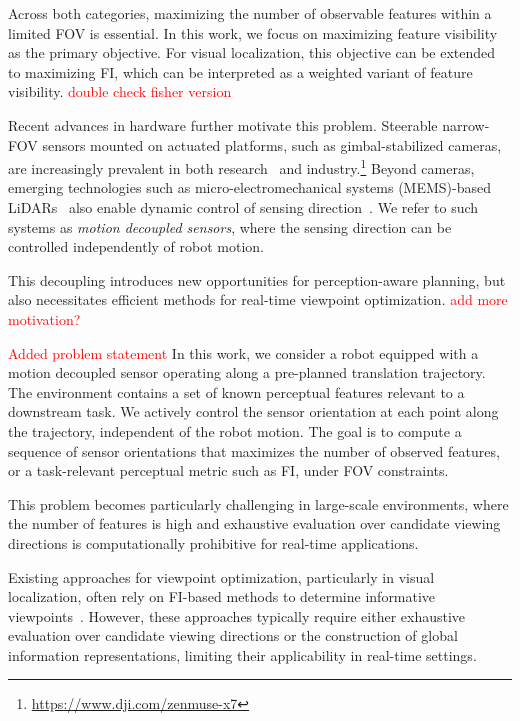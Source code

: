 \documentclass[letterpaper, 10 pt, conference]{ieeeconf}  %
\begin{document}
Across both categories, maximizing the number of observable features within a limited FOV is essential. In this work, we focus on maximizing feature visibility as the primary objective. For visual localization, this objective can be extended to maximizing FI, which can be interpreted as a weighted variant of feature visibility. \textcolor{red}{double check fisher version}

Recent advances in hardware further motivate this problem. Steerable narrow-FOV sensors mounted on actuated platforms, such as gimbal-stabilized cameras, are increasingly prevalent in both research~\cite{liu2020real, jakobsen2005control, zou2006pan} and industry.\footnote{\url{https://www.dji.com/zenmuse-x7}} Beyond cameras, emerging technologies such as micro-electromechanical systems (MEMS)-based LiDARs~\cite{wang2017ultra,wang2019large,wang2020low} also enable dynamic control of sensing direction~\cite{https://doi.org/10.48550/arxiv.2302.14334}. We refer to such systems as \emph{motion decoupled sensors}, where the sensing direction can be controlled independently of robot motion.

This decoupling introduces new opportunities for perception-aware planning, but also necessitates efficient methods for real-time viewpoint optimization. \textcolor{red}{add more motivation?}



\textcolor{red}{Added problem statement} In this work, we consider a robot equipped with a motion decoupled sensor operating along a pre-planned translation trajectory. The environment contains a set of known perceptual features relevant to a downstream task. We actively control the sensor orientation at each point along the trajectory, independent of the robot motion. The goal is to compute a sequence of sensor orientations that maximizes the number of observed features, or a task-relevant perceptual metric such as FI, under FOV constraints.

This problem becomes particularly challenging in large-scale environments, where the number of features is high and exhaustive evaluation over candidate viewing directions is computationally prohibitive for real-time applications.


Existing approaches for viewpoint optimization, particularly in visual localization, often rely on FI-based methods to determine informative viewpoints~\cite{zhang2019beyond, zhang2020fisher}. However, these approaches typically require either exhaustive evaluation over candidate viewing directions or the construction of global information representations, limiting their applicability in real-time settings.
\end{document}
